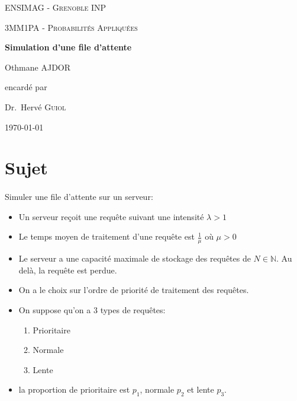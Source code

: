 \documentclass[12pt,a4paper,draft]{report}
\begin{document}
\begin{titlepage}
    \centering
    {\scshape\LARGE ENSIMAG - Grenoble INP \par}
    \vspace{1cm}
    {\scshape\Large 3MM1PA - Probabilités Appliquées\par}
    \vspace{1.5cm}
    {\huge\bfseries Simulation d'une file d'attente\par}
    \vspace{2cm}
    {\Large Othmane AJDOR\par}
    \vfill
    encardé par\par
    Dr.~Hervé \textsc{Guiol}

    \vfill


    {\large \today\par}
\end{titlepage}

\newpage
    \section*{Sujet}
    \paragraph{}
    Simuler une file d'attente sur un serveur:
    \begin{itemize}
        \item Un serveur reçoit une requête suivant une intensité $\lambda > 1$
        \item Le temps moyen de traitement d'une requête est $\frac{1}{\mu}$ où $\mu > 0$
        \item Le serveur a une capacité maximale de stockage des requêtes de \linebreak $N \in \mathbb{N}$. 
         Au delà, la requête est perdue.
        \item On a le choix sur l'ordre de priorité de traitement des requêtes.
        \item On suppose qu'on a 3 types de requêtes:
            \begin{enumerate}
                \item Prioritaire
                \item Normale
                \item Lente
            \end{enumerate}
        \item la proportion de prioritaire est $p_1$, normale $p_2$ et lente $p_3$.
    \end{itemize}
\end{document}
